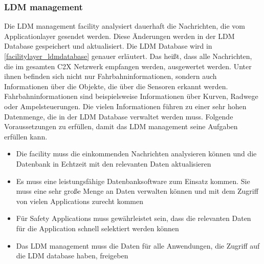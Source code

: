 \subsubsection{LDM management \label{facilitylayer_LDMManagement}}
Die \ac{LDM} management facility analysiert dauerhaft die Nachrichten, die vom Applicationlayer gesendet werden. Diese Änderungen werden in der \ac{LDM} Database gespeichert und aktualisiert. Die LDM Database wird in \autoref{facilitylayer_ldmdatabase} genauer erläutert. Das heißt, dass alle Nachrichten, die im gesamten \ac{C2X} Netzwerk empfangen werden, ausgewertet werden. Unter ihnen befinden sich nicht nur Fahrbahninformationen,  sondern auch Informationen über die Objekte, die über die Sensoren erkannt werden. Fahrbahninformationen sind beispielsweise Informationen über Kurven, Radwege oder Ampelsteuerungen. Die vielen Informationen führen zu einer sehr hohen Datenmenge, die in der \ac{LDM} Database verwaltet werden muss.  Folgende Voraussetzungen zu erfüllen, damit das \ac{LDM} management seine Aufgaben erfüllen kann.
\begin{itemize}
	\item Die facility muss die einkommenden Nachrichten analysieren können und die Datenbank in Echtzeit mit den relevanten Daten aktualisieren

	\item Es muss eine leistungsfähige Datenbanksoftware zum Einsatz kommen. Sie muss eine sehr große Menge an Daten verwalten können und mit dem Zugriff von vielen Applications zurecht kommen 
	
	\item Für Safety Applications muss gewährleistet sein, dass die relevanten Daten für die Application schnell selektiert werden können

	\item Das \ac{LDM} management  muss die Daten für alle Anwendungen, die  Zugriff auf die \ac{LDM} database haben, freigeben
\end{itemize}

